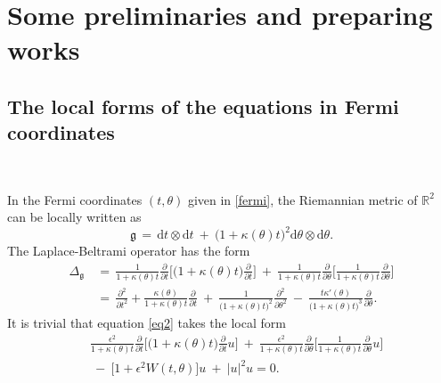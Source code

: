 \documentclass[10pt, reqno]{amsart}
\numberwithin{equation}{section}
\theoremstyle{definition}
\begin{document}
{%

\medskip
\section{Some preliminaries and preparing works} \label{Section3}

\subsection{ The local forms of the equations in Fermi coordinates}\label{Section3.1}\


In the Fermi coordinates $(t, \theta)$ given in \eqref{fermi}, the Riemannian metric of ${\mathbb R}^2$ can be locally written as
\begin{equation*}
\mathfrak{g} \,=\,{\mathrm d}t\otimes{\mathrm d}t \ +\ \big(1 + \kappa(\theta) t\big)^2 {\mathrm d}\theta\otimes{\mathrm d}\theta.
\end{equation*}
The Laplace-Beltrami operator has the form
\begin{align}
\Delta_\mathfrak{g}
& \,=\, \frac{1}{1+\kappa(\theta) t} \frac{\partial}{\partial t} \Bigg[ \big(1+\kappa(\theta) t\big) \frac{\partial}{\partial t} \Bigg]
\ +\
\frac{1}{1+\kappa(\theta) t}\frac{\partial}{\partial \theta} \Bigg[ \frac{1}{1+\kappa(\theta) t} \frac{\partial}{\partial \theta} \Bigg]
\nonumber\\[2mm]
& \,=\, \frac{\partial^2}{\partial t^2}+ \frac{\kappa(\theta)}{1+\kappa(\theta) t} \frac{\partial }{\partial t}
\ +\
\frac{1}{\big(1+\kappa(\theta) t\big)^2 }\frac{\partial^2}{\partial \theta^2}
\ -\
\frac{ t \kappa'(\theta)}{\big(1+ \kappa(\theta) t\big)^3 }\frac{\partial}{\partial \theta}.
\label{Laplacian}
\end{align}
It is trivial that equation \eqref{eq2} takes the local form
\begin{align}
& \frac{\epsilon^2}{1+\kappa(\theta) t} \frac{\partial}{\partial t} \Bigg[ \big(1+\kappa(\theta) t\big) \frac{\partial}{\partial t} u\Bigg]
\ +\
\frac{\epsilon^2}{1+\kappa(\theta) t}\frac{\partial}{\partial \theta} \Bigg[ \frac{1}{1+\kappa(\theta) t} \frac{\partial}{\partial \theta} u\Bigg]
\nonumber\\[2mm]
&\ -\
\big[1+ \epsilon^2 W (t, \theta) \big] u
\ +\
|u|^2 u
 =0.
\label{eq3.1-0}
\end{align}


}
\end{document}
